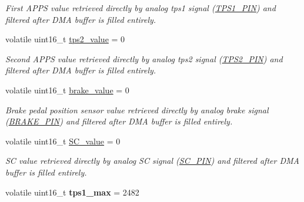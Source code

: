 \begin{DoxyCompactItemize}
\begin{DoxyCompactList}\small\item\em First A\-P\-P\-S value retrieved directly by analog tps1 signal (\hyperlink{group___board__model__group_gae9aa914854f611488701c96a330b0bd4}{T\-P\-S1\-\_\-\-P\-I\-N}) and filtered after D\-M\-A buffer is filled entirely. \end{DoxyCompactList}\item 
\hypertarget{group___board__model__group_gaa8a9b03858f40eadfd5d3d6c3e266834}{volatile uint16\-\_\-t \hyperlink{group___board__model__group_gaa8a9b03858f40eadfd5d3d6c3e266834}{tps2\-\_\-value} = 0}\label{group___board__model__group_gaa8a9b03858f40eadfd5d3d6c3e266834}

\begin{DoxyCompactList}\small\item\em Second A\-P\-P\-S value retrieved directly by analog tps2 signal (\hyperlink{group___board__model__group_gab13a816bae3ca994897fc6f1cb590a67}{T\-P\-S2\-\_\-\-P\-I\-N}) and filtered after D\-M\-A buffer is filled entirely. \end{DoxyCompactList}\item 
\hypertarget{group___board__model__group_gad7966e70fb4bebc6947eb3fbb059a3c9}{volatile uint16\-\_\-t \hyperlink{group___board__model__group_gad7966e70fb4bebc6947eb3fbb059a3c9}{brake\-\_\-value} = 0}\label{group___board__model__group_gad7966e70fb4bebc6947eb3fbb059a3c9}

\begin{DoxyCompactList}\small\item\em Brake pedal position sensor value retrieved directly by analog brake signal (\hyperlink{group___board__model__group_gad632b56bf4c6259a390c3db91607078e}{B\-R\-A\-K\-E\-\_\-\-P\-I\-N}) and filtered after D\-M\-A buffer is filled entirely. \end{DoxyCompactList}\item 
\hypertarget{group___board__model__group_ga0b4151ed3267a5fae4789f4b3ffe7bbd}{volatile uint16\-\_\-t \hyperlink{group___board__model__group_ga0b4151ed3267a5fae4789f4b3ffe7bbd}{S\-C\-\_\-value} = 0}\label{group___board__model__group_ga0b4151ed3267a5fae4789f4b3ffe7bbd}

\begin{DoxyCompactList}\small\item\em S\-C value retrieved directly by analog S\-C signal (\hyperlink{group___board__model__group_gabbdb157ae4ad39d102935c21fa30d1c5}{S\-C\-\_\-\-P\-I\-N}) and filtered after D\-M\-A buffer is filled entirely. \end{DoxyCompactList}\item 
\hypertarget{group___board__model__group_gaf1d46fb483b2a63c3da25c11688af7c4}{volatile uint16\-\_\-t {\bfseries tps1\-\_\-max} = 2482}\label{group___board__model__group_gaf1d46fb483b2a63c3da25c11688af7c4}


\end{DoxyCompactItemize}
